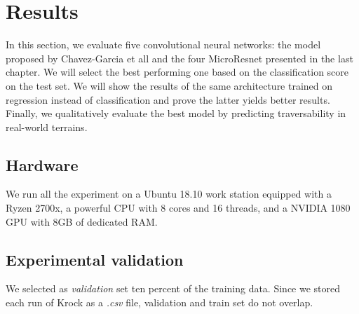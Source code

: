 \documentclass[../document.tex]{subfiles}
\begin{document}
\chapter{Results}
\label{chap: results}
In this section, we evaluate five convolutional neural networks: the model proposed by Chavez-Garcia et all \cite{omar2018traversability} and the four MicroResnet presented in the last chapter. We will select the best performing one based on the classification score on the test set. We will show the results of the same architecture trained on regression instead of classification and prove the latter yields better results. Finally, we qualitatively evaluate the best model by predicting traversability in real-world terrains. 
\section{Hardware}
We run all the experiment on a Ubuntu 18.10  work station equipped with a Ryzen 2700x, a powerful CPU with 8 cores and 16 threads, and a NVIDIA 1080 GPU with 8GB of dedicated RAM.

\section{Experimental validation}
We selected as \emph{validation} set ten percent of the training data. Since we stored each run of Krock as a \emph{.csv} file, validation and train set do not overlap.

\end{document}

